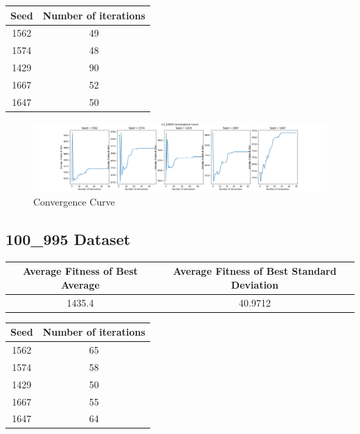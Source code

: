 \documentclass{article}
\begin{document}
\begin{center}
	\begin{tabular}{|c|c|}
		\hline
		Seed & Number of iterations \\
		\hline
		1562 & 49 \\
		\hline
		1574 & 48 \\
		\hline
		1429 & 90 \\
		\hline
		1667 & 52 \\
		\hline
		1647 & 50 \\
		\hline
	\end{tabular}
\end{center}

\begin{figure}[h!]
	\centering
	\includegraphics[width=\linewidth]{knapsack_23_10000.png}
	\caption{Convergence Curve}
\end{figure}

\subsection*{100\_995 Dataset}
\begin{center}
	\begin{tabular}{|c|c|}
		\hline
		Average Fitness of Best Average & Average Fitness of Best Standard Deviation \\
		\hline
		1435.4 & 40.9712 \\
		\hline
	\end{tabular}
\end{center}

\begin{center}
	\begin{tabular}{|c|c|}
		\hline
		Seed & Number of iterations \\
		\hline
		1562 & 65 \\
		\hline
		1574 & 58 \\
		\hline
		1429 & 50 \\
		\hline
		1667 & 55 \\
		\hline
		1647 & 64 \\
		\hline
	\end{tabular}
\end{center}
\end{document}

